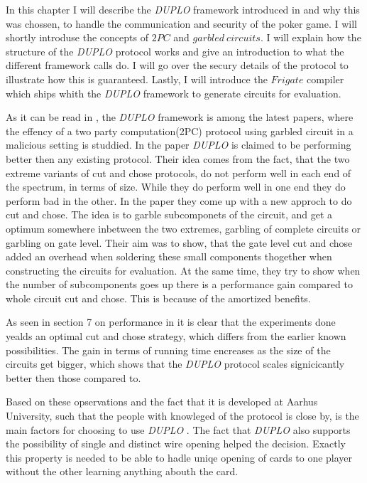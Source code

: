 \documentclass[twoside,11pt,openright]{report}
\newcommand{\DUPLO}{\textit{DUPLO} }
\begin{document}
In this chapter I will describe the \DUPLO framework introduced in  and why this was chossen, to handle the communication and security of the poker game. I will shortly introduse the concepts of $2PC$ and $garbled~circuits$. I will explain how the structure of the \DUPLO protocol works and give an introduction to what the different framework calls do. I will go over the secury details of the protocol to illustrate how this is guaranteed. Lastly, I will introduce the $Frigate$ compiler which ships whith the \DUPLO framework to generate circuits for evaluation.

\bigskip

As it can be read in , the \DUPLO framework is among the latest papers, where the effency of a two party computation(2PC) protocol using garbled circuit in a malicious setting is studdied. In the paper \DUPLO is claimed to be performing better then any existing protocol. Their idea comes from the fact, that the two extreme variants of cut and chose protocols, do not perform well in each end of the spectrum, in terms of size. While they do perform well in one end they do perform bad in the other. In the paper they come up with a new approch to do cut and chose. The idea is to garble subcomponets of the circuit, and get a optimum somewhere inbetween the two extremes, garbling of complete circuits or garbling on gate level. Their aim was to show, that the gate level cut and chose added an overhead when soldering these small components thogether when constructing the circuits for evaluation. At the same time, they try to show when the number of subcomponents goes up there is a performance gain compared to whole circuit cut and chose. This is because of the amortized benefits.

As seen in section 7 on performance in  it is clear that the experiments done yealds an optimal cut and chose strategy, which differs from the earlier known possibilities. The gain in terms of running time encreases as the size of the circuits get bigger, which shows that the \DUPLO protocol scales signicicantly better then those compared to.

\bigskip

Based on these opservations and the fact that it is developed at Aarhus University, such that the people with knowleged of the protocol is close by, is the main factors for choosing to use \DUPLO. The fact that \DUPLO also supports the possibility of single and distinct wire opening helped the decision. Exactly this property is needed to be able to hadle uniqe opening of cards to one player without the other learning anything abouth the card.
\end{document}
